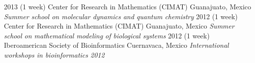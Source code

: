 \documentclass[]{friggeri-cv} %
\begin{document}
\begin{entrylist}
\entry
{2013}
{(1 week)}
{Center for Research in Mathematics (CIMAT)}
{Guanajuato, Mexico}
{\emph{Summer school on molecular dynamics and quantum chemistry}}
{\vspace{-3mm}}
\entry
{2012}
{(1 week)}
{Center for Research in Mathematics (CIMAT)}
{Guanajuato, Mexico}
{\emph{Summer school on mathematical modeling of biological systems}}
{\vspace{-3mm}}
\entry
{2012}
{(1 week)}
{Iberoamerican Society of Bioinformatics}
{Cuernavaca, Mexico}
{\emph{International workshops in bioinformatics 2012}}
{\vspace{-3mm}}
\end{entrylist}

\end{document}
